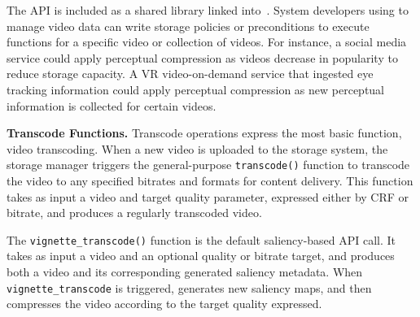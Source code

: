 \begin{table*}[h]
\centering
\caption{\name API}
\label{table:policies}

\end{table*}

The \name API is included as a shared library linked into~\lightdb.
System developers using \nameStore to manage video data can write storage policies or preconditions to execute \nameStore functions for a specific video or collection of videos.
For instance, a social media service could apply perceptual compression as videos decrease in popularity to reduce storage capacity.
A VR video-on-demand service that ingested eye tracking information could apply perceptual compression as new perceptual information is collected for certain videos.

\noindent\textbf{Transcode Functions.}
Transcode operations express the most basic \nameStore function, video transcoding.
When a new video is uploaded to the storage system, the storage manager triggers the general-purpose \texttt{transcode()} function to transcode the video to any specified bitrates and formats for content delivery.
This function takes as input a video and target quality parameter, expressed either by CRF or bitrate, and produces a regularly transcoded video.

The \texttt{vignette\_transcode()} function is the default saliency-based API call.
It takes as input a video and an optional quality or bitrate target, and produces both a video and its corresponding generated saliency metadata.
When \texttt{vignette\_transcode} is triggered, \nameStore generates new saliency maps, and then compresses the video according to the target quality expressed.

